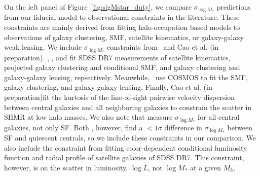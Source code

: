 \documentclass[12pt, letterpaper, preprint, tighten]{aastex62}
\newcommand{\cao}{Cao et al. (in preparation)}
\newcommand{\siglogm}{\sigma_{\log M_*}}
\begin{document}
On the left panel of Figure~\ref{fig:sigMstar_duty}, we compare $\siglogm$
predictions from our fiducial model to observational constraints in the 
literature. These constraints are mainly derived from fitting halo-occupation 
based models to observations of galaxy clustering, SMF, satellite kinematics, 
or galaxy-galaxy weak lensing. We include $\siglogm$ constraints 
from~\cite{more2011, leauthaud2012, reddick2013, tinker2013, zu2015} and \cao. 
\cite{more2011}, \cite{reddick2013}, and \cite{zu2015} fit SDSS DR7 measurements 
of satellite kinematics, projected galaxy clustering and conditional SMF, and 
galaxy clustering and galaxy-galaxy lensing, repsectively. Meanwhile,~\cite{leauthaud2012, tinker2013}
use COSMOS to fit the SMF, galaxy clustering, and galaxy-galaxy lensing.
Finally, \cao fit the kurtosis of the line-of-sight pairwise velocity 
dispersion between central galaxies and all neighboring galaxies to constrain 
the scatter in SHMR at low halo masses. We also note that
\cite{leauthaud2012, reddick2013, zu2015} measure $\siglogm$ for all central 
galaxies, not only SF. Both \cite{more2011, tinker2013},
however, find a $< 1\sigma$ difference in $\siglogm$ between SF and quiescent 
centrals, so we include these constraints in our comparison. We also include 
the \cite{lange2018a} constraint from fitting color-dependent conditional 
luminosity function and radial profile of satellite galaxies of SDSS DR7. This 
constraint, however, is on the scatter in luminosity, $\log L$, not $\log M_*$ 
at a given $M_h$.

\end{document}
